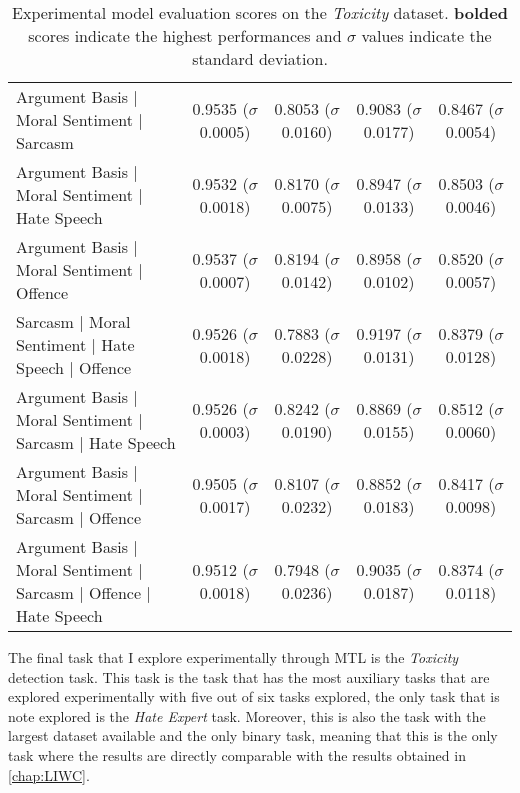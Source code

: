 {\begin{landscape}
\begin{table}[]
{\begin{tabular}{l|cccc}
    Argument Basis | Moral Sentiment | Sarcasm                          & 0.9535 ($\sigma$ 0.0005)          & 0.8053 ($\sigma$ 0.0160)          & 0.9083 ($\sigma$ 0.0177)          & 0.8467 ($\sigma$ 0.0054)          \\
    Argument Basis | Moral Sentiment | Hate Speech                      & 0.9532 ($\sigma$ 0.0018)          & 0.8170 ($\sigma$ 0.0075)          & 0.8947 ($\sigma$ 0.0133)          & 0.8503 ($\sigma$ 0.0046)          \\
    Argument Basis | Moral Sentiment | Offence                          & 0.9537 ($\sigma$ 0.0007)          & 0.8194 ($\sigma$ 0.0142)          & 0.8958 ($\sigma$ 0.0102)          & 0.8520 ($\sigma$ 0.0057)          \\
    Sarcasm | Moral Sentiment | Hate Speech | Offence                   & 0.9526 ($\sigma$ 0.0018)          & 0.7883 ($\sigma$ 0.0228)          & 0.9197 ($\sigma$ 0.0131)          & 0.8379 ($\sigma$ 0.0128)          \\
    Argument Basis | Moral Sentiment | Sarcasm | Hate Speech            & 0.9526 ($\sigma$ 0.0003)          & 0.8242 ($\sigma$ 0.0190)          & 0.8869 ($\sigma$ 0.0155)          & 0.8512 ($\sigma$ 0.0060)          \\
    Argument Basis | Moral Sentiment | Sarcasm | Offence                & 0.9505 ($\sigma$ 0.0017)          & 0.8107 ($\sigma$ 0.0232)          & 0.8852 ($\sigma$ 0.0183)          & 0.8417 ($\sigma$ 0.0098)          \\
    Argument Basis | Moral Sentiment | Sarcasm | Offence | Hate Speech  & 0.9512 ($\sigma$ 0.0018)          & 0.7948 ($\sigma$ 0.0236)          & 0.9035 ($\sigma$ 0.0187)          & 0.8374 ($\sigma$ 0.0118)
  \end{tabular}%
  }
  \caption{Experimental model evaluation scores on the \textit{Toxicity} dataset. \textbf{bolded} scores indicate the highest performances and $\sigma$ values indicate the standard deviation.}
  \label{tab:mtl_test_wulczyn}
\end{table}
\end{landscape}
}

The final task that I explore experimentally through MTL is the \textit{Toxicity} detection task.
This task is the task that has the most auxiliary tasks that are explored experimentally with five out of six tasks explored, the only task that is note explored is the \textit{Hate Expert} task.
Moreover, this is also the task with the largest dataset available and the only binary task, meaning that this is the only task where the results are directly comparable with the results obtained in \cref{chap:LIWC}.

